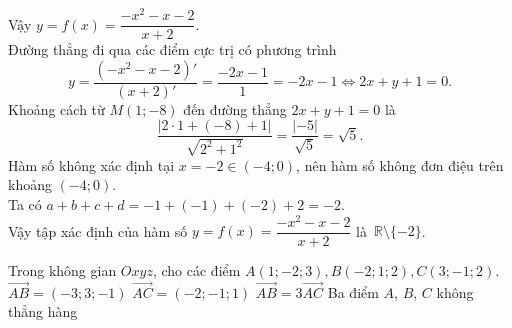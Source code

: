 \begin{ex}
{\begin{itemchoice}
			Vậy  $y=f(x)=\dfrac{-x^2-x-2}{x+2}$.\\
			Đường thẳng đi qua các điểm cực  trị có phương trình $$y=\dfrac{(-x^2-x-2)'}{(x+2)'} = \dfrac{-2x-1}{1} = -2x-1 \Leftrightarrow 2x+y+1=0.$$
			Khoảng cách từ $M(1;-8)$  đến đường thẳng $2x+y+1=0$ là~$$\dfrac{|2 \cdot 1+(-8)+1|}{\sqrt{2^2+1^2}} = \dfrac{|-5|}{\sqrt{5}} = \sqrt{5}.$$
			\itemch Hàm số không xác định  tại $x=-2 \in (-4;0)$, nên hàm số không đơn điệu trên khoảng $(-4;0)$.\\
			 \itemch Ta có $a+b+c+d = -1+(-1)+(-2)+2 = -2$.\\
			\itemch  Vậy tập xác định của hàm số $y=f(x)=\dfrac{-x^2-x-2}{x+2}$ là~$\mathbb{R} \setminus \{-2\}$.
		\end{itemchoice}
	} 
\end{ex}

\begin{ex}%
	Trong không gian $Oxyz$, cho các điểm $A(1; -2; 3), B(-2; 1; 2), C(3;  -1; 2)$.
	\choiceTF 
		{\True  $\overrightarrow{AB}=(-3; 3; -1)$}
		{$\overrightarrow{AC}=(-2; -1;  1)$}
		{$\overrightarrow{AB}=3\overrightarrow{AC}$} 
		 {\True Ba điểm $A$, $B$, $C$ không thẳng hàng}
\end{ex}

